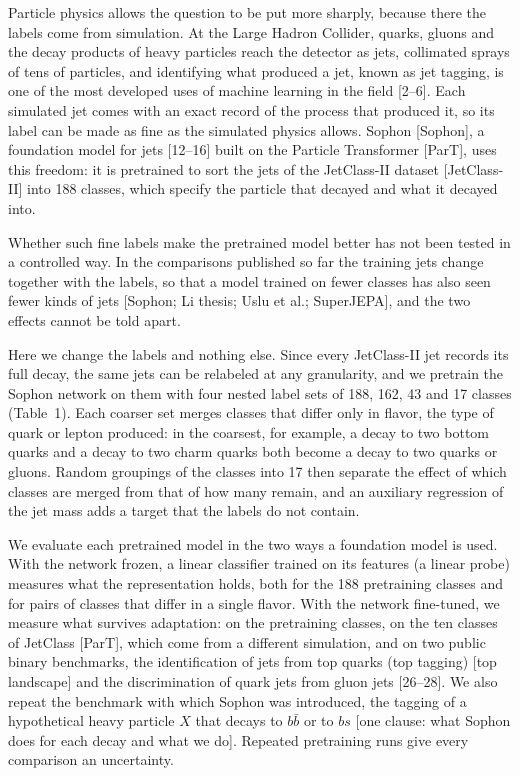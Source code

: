 \documentclass[11pt,a4paper]{article}
\newcommand{\ct}[1]{\textcolor{black!55}{[#1]}}
\newcommand{\chk}[1]{\textcolor{red!70!black}{#1}}
\newcommand{\bb}{b\bar{b}}
\begin{document}
Particle physics allows the question to be put more sharply, because there the labels come from
simulation.
At the Large Hadron Collider, quarks, gluons and the decay products of heavy particles reach the
detector as jets, collimated sprays of tens of particles, and identifying what produced a jet,
known as jet tagging, is one of the most developed uses of machine learning in the field
\ct{2--6}.
Each simulated jet comes with an exact record of the process that produced it, so its label can
be made as fine as the simulated physics allows.
Sophon \ct{Sophon}, a foundation model for jets \ct{12--16} built on the Particle Transformer
\ct{ParT}, uses this freedom: it is pretrained to sort the jets of the JetClass-II dataset
\ct{JetClass-II} into 188 classes, which specify the particle that decayed and what it decayed
into.

Whether such fine labels make the pretrained model better has not been tested in a controlled way.
In the comparisons published so far the training jets change together with the labels, so that a
model trained on fewer classes has also seen fewer kinds of jets
\ct{Sophon; Li thesis; Uslu et al.; SuperJEPA}, and the two effects cannot be told apart.

Here we change the labels and nothing else.
Since every JetClass-II jet records its full decay, the same jets can be relabeled at any
granularity, and we pretrain the Sophon network on them with four nested label sets of 188, 162,
43 and 17 classes (Table~1).
Each coarser set merges classes that differ only in flavor, the type of quark or lepton produced:
in the coarsest, for example, a decay to two bottom quarks and a decay to two charm quarks both
become a decay to two quarks or gluons.
Random groupings of the classes into 17 then separate the effect of which classes are merged from
that of how many remain, and an auxiliary regression of the jet mass adds a target that the labels
do not contain.

We evaluate each pretrained model in the two ways a foundation model is used.
With the network frozen, a linear classifier trained on its features (a linear probe) measures
what the representation holds, both for the 188 pretraining classes and for pairs of classes that
differ in a single flavor.
With the network fine-tuned, we measure what survives adaptation: on the pretraining classes, on
the ten classes of JetClass \ct{ParT}, which come from a different simulation, and on two public
binary benchmarks, the identification of jets from top quarks (top tagging) \ct{top landscape}
and the discrimination of quark jets from gluon jets \ct{26--28}.
We also repeat the benchmark with which Sophon was introduced, the tagging of a hypothetical
heavy particle $X$ that decays to $\bb$ or to $bs$
\chk{[one clause: what Sophon does for each decay and what we do]}.
Repeated pretraining runs give every comparison an uncertainty.
\end{document}
